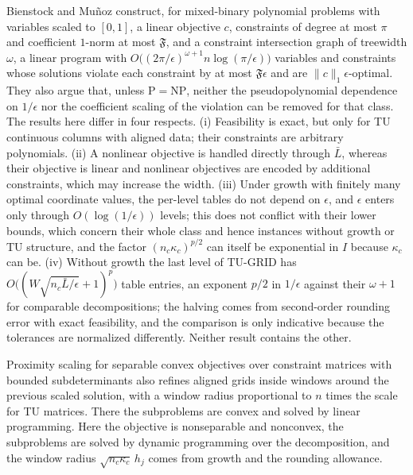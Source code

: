 \begin{remark}\label{rem:tu-bm}
Bienstock and Mu\~noz \cite[Theorems~4 and~15]{BienstockMunoz2018} construct,
for mixed-binary polynomial problems with variables scaled to $[0,1]$, a linear
objective $c$, constraints of degree at most $\pi$ and coefficient $1$-norm at
most $\mathfrak F$, and a constraint intersection graph of treewidth $\omega$, a
linear program with $O\bigl((2\pi/\epsilon)^{\omega+1}n\log(\pi/\epsilon)\bigr)$
variables and constraints whose solutions violate each constraint by at most
$\mathfrak F\epsilon$ and are $\lVert c\rVert_1\epsilon$-optimal. They also argue that,
unless $\mathrm P=\mathrm{NP}$, neither the pseudopolynomial dependence on
$1/\epsilon$ nor the coefficient scaling of the violation can be removed for that
class. The results here differ in four respects. (i) Feasibility is exact, but
only for TU continuous columns with aligned data; their constraints are
arbitrary polynomials. (ii) A nonlinear objective is handled directly through
$\bar L$, whereas their objective is linear and nonlinear objectives are
encoded by additional constraints, which may increase the width. (iii) Under
growth with finitely many optimal coordinate values, the per-level tables do
not depend on $\epsilon$, and $\epsilon$ enters only through $O(\log(1/\epsilon))$ levels;
this does not conflict with their lower bounds, which concern their whole
class and hence instances without growth or TU structure, and the factor
$(n_c\kappa_c)^{p/2}$ can itself be exponential in $I$ because $\kappa_c$ can be. (iv) Without growth the last level of
TU-GRID has $O\bigl((W\sqrt{n_c\bar L/\epsilon}+1)^p\bigr)$ table entries, an exponent
$p/2$ in $1/\epsilon$ against their $\omega+1$ for comparable decompositions; the
halving comes from second-order rounding error with exact feasibility, and
the comparison is only indicative because the tolerances are normalized
differently. Neither result contains the other.

Proximity scaling for separable convex objectives over constraint matrices
with bounded subdeterminants \cite{HochbaumShanthikumar1990} also refines
aligned grids inside windows around the previous scaled solution, with a
window radius proportional to $n$ times the scale for TU matrices. There the
subproblems are convex and solved by linear programming. Here the objective is
nonseparable and nonconvex, the subproblems are solved by dynamic programming
over the decomposition, and the window radius $\sqrt{n_c\kappa_c}\,h_j$ comes
from growth and the rounding allowance.
\end{remark}
